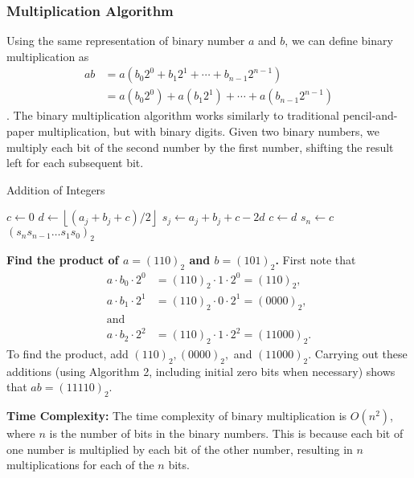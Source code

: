     \subsubsection*{Multiplication Algorithm}
        Using the same representation of binary number $a$ and $b$, we can define binary multiplication
        as $$\begin{aligned}a b & =a\left(b_{0} 2^{0}+b_{1} 2^{1}+\cdots+b_{n-1} 2^{n-1}\right) \\& =a\left(b_{0} 2^{0}\right)+a\left(b_{1} 2^{1}\right)+\cdots+a\left(b_{n-1} 2^{n-1}\right)\end{aligned}$$.
        The binary multiplication algorithm works similarly to traditional pencil-and-paper multiplication, but with binary digits. Given two binary numbers, we multiply each bit of the second number by the first number, shifting the result left for each subsequent bit.
        \begin{algorithm}
            \caption{Addition of Integers}
            \begin{algorithmic}
                \State $c \gets 0$
                    \State $d \gets \left\lfloor (a_j + b_j + c)/2 \right\rfloor$
                    \State $s_j \gets a_j + b_j + c - 2d$
                    \State $c \gets d$
                \EndFor
                \State $s_n \gets c$
                \State \Return $(s_{n}s_{n-1}\ldots s_1s_0)_2$ 
            \EndProcedure
            \end{algorithmic}
            \end{algorithm}

        \begin{example}
            \textbf{Find the product of \( a = (110)_2 \) and \( b = (101)_2 \).}
            First note that
            \begin{align*}
            a \cdot b_0 \cdot 2^0 &= (110)_2 \cdot 1 \cdot 2^0 = (110)_2, \\
            a \cdot b_1 \cdot 2^1 &= (110)_2 \cdot 0 \cdot 2^1 = (0000)_2, \\
            \text{and} \\
            a \cdot b_2 \cdot 2^2 &= (110)_2 \cdot 1 \cdot 2^2 = (11000)_2.
            \end{align*}
            To find the product, add \( (110)_2, (0000)_2, \) and \( (11000)_2 \). Carrying out these additions (using Algorithm 2, including initial zero bits when necessary) shows that \( ab = (11110)_2 \).

        \textbf{Time Complexity:} The time complexity of binary multiplication is \(O(n^2)\), where \(n\) is the number of bits in the binary numbers. This is because each bit of one number is multiplied by each bit of the other number, resulting in \(n\) multiplications for each of the \(n\) bits.
        \end{example}

